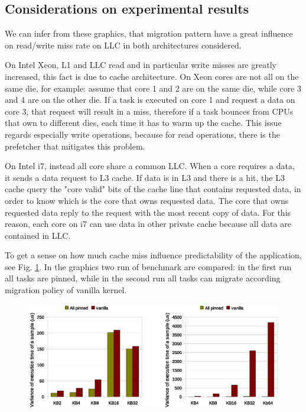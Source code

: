 \newpage
\subsection{Considerations on experimental results}

We can infer from these graphics, that migration pattern have a great influence on read/write miss rate on LLC in both architectures considered. 

On Intel Xeon, L1 and LLC read and in particular write misses are greatly increased, this fact is due to cache architecture. On Xeon cores are not all on 
the same die, for example: assume that core 1 and 2 are on the same die, while core 3 and 4 are on the other die. If a task is executed on core 1 and 
request a data on core 3, that request will result in a miss, therefore if a task bounces from CPUs that own to different dies, each time it has to warm 
up the cache. This issue regards especially write operations, because for read operations, there is the prefetcher that mitigates this problem.

On Intel i7, instead all core share a common LLC. When a core requires a data, it sends a data request to L3 cache. If data is in L3 and there is a hit, 
the L3 cache query the "core valid" bits of the cache line that contains requested data, in order to know which is the core that owns requested data. The 
core that owns requested data reply to the request with the most recent copy of data. For this reason, each core on i7 can use data in other private cache
because all data are contained in LLC.

To get a sense on how much cache miss influence predictability of the application, see Fig. \ref{fig:time_cpf_var_Xeon_i7}. In the graphics two run of 
benchmark are compared: in the first run all tasks are pinned, while in the second run all tasks can migrate according migration policy of vanilla kernel.

\begin{figure}[htbp]
\centering
\includegraphics[width=\widefigure]{images/cpf_time/time_cpf_var_Xeon_i7.eps}
\caption{}
\label{fig:time_cpf_var_Xeon_i7}
\end{figure}

